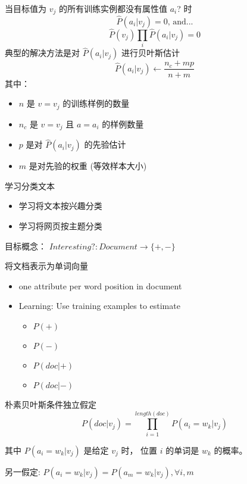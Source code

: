 \documentclass[presentation]{beamer}
\begin{document}
\begin{frame}[label={sec:orgae7f781}]{当目标值为 \(v_j\) 的所有训练实例都没有属性值 \(a_i\)? 时}
$$\hat{P}(a_i|v_j) = 0 \mbox{, and...}$$
$$\hat{P}(v_{j}) \prod_{i} \hat{P}(a_{i} | v_{j}) = 0$$
典型的解决方法是对 \(\hat{P}(a_{i} | v_{j})\) 进行贝叶斯估计
   $$\hat{P}(a_{i} | v_{j}) \leftarrow \frac{n_{c} + mp}{n + m}$$
其中：
\begin{itemize}
\item \(n\) 是 \(v=v_j\) 的训练样例的数量
\item \(n_c\) 是 \(v=v_j\) 且 \(a=a_i\) 的样例数量
\item \(p\) 是对 \(\hat{P}(a_{i} | v_{j})\) 的先验估计
\item \(m\) 是对先验的权重 (等效样本大小)
\end{itemize}
\end{frame}

\begin{frame}[label={sec:org57a319d}]{学习分类文本}
\begin{itemize}
\item 学习将文本按兴趣分类
\item 学习将网页按主题分类
\end{itemize}


目标概念： \(Interesting? : Document \rightarrow \{+,-\}\)
\end{frame}

\begin{frame}[label={sec:org8804595}]{将文档表示为单词向量}
\begin{itemize}
\item one attribute per word position in document
\item Learning: Use training examples to estimate
\begin{itemize}
\item \(P(+)\)
\item \(P(-)\)
\item \(P(doc|+)\)
\item \(P(doc|-)\)
\end{itemize}
\end{itemize}
\end{frame}

\begin{frame}[label={sec:orga96a1f1}]{朴素贝叶斯条件独立假定}
$$P(doc|v_j) = \prod_{i=1}^{length(doc)} P(a_i=w_k | v_j)$$

其中 \(P(a_i=w_k| v_j)\) 是给定 \(v_j\) 时， 位置 \(i\) 的单词是 \(w_k\) 的概率。

另一假定: \(P(a_i=w_k|v_j) = P(a_m=w_k|v_j), \forall i,m\)
\end{frame}
\end{document}

